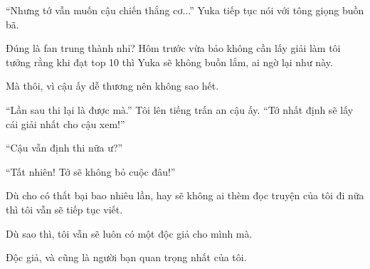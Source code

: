 {``Nhưng tớ vẫn muốn cậu chiến thắng cơ...'' Yuka tiếp tục nói với tông
giọng buồn bã.

Đúng là fan trung thành nhỉ? Hôm trước vừa bảo không cần lấy giải làm
tôi tưởng rằng khi đạt top 10 thì Yuka sẽ không buồn lắm, ai ngờ lại như
này.

Mà thôi, vì cậu ấy dễ thương nên không sao hết.

``Lần sau thi lại là được mà.'' Tôi lên tiếng trấn an cậu ấy. ``Tớ nhất
định sẽ lấy cái giải nhất cho cậu xem!''

``Cậu vẫn định thi nữa ư?''

``Tất nhiên! Tớ sẽ không bỏ cuộc đâu!''

Dù cho có thất bại bao nhiêu lần, hay sẽ không ai thèm đọc truyện của
tôi đi nữa thì tôi vẫn sẽ tiếp tục viết.

Dù sao thì, tôi vẫn sẽ luôn có một độc giả cho mình mà.

Độc giả, và cũng là người bạn quan trọng nhất của tôi.
}